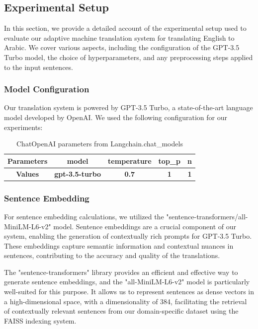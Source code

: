 \documentclass[12pt]{article}
\begin{document}
\subsection{Experimental Setup}

In this section, we provide a detailed account of the experimental setup used to evaluate our adaptive machine translation system for translating English to Arabic. We cover various aspects, including the configuration of the GPT-3.5 Turbo model, the choice of hyperparameters, and any preprocessing steps applied to the input sentences.

\subsubsection{Model Configuration}

Our translation system is powered by GPT-3.5 Turbo, a state-of-the-art language model developed by OpenAI. We used the following configuration for our experiments:


\begin{table}[h]
	\centering
	\begin{tabular}{|c|c|c|c|c|}
		\hline
		\textbf{Parameters} & \textbf{model} & \textbf{temperature} & \textbf{top\_p} & \textbf{n}\\
		\hline
		\textbf{Values} & \textbf{gpt-3.5-turbo} & \textbf{0.7}  & \textbf{1}  & \textbf{1}\\
		\hline
	\end{tabular}
	\caption{ChatOpenAI parameters from Langchain.chat\_models}
	\label{table:param_values}
\end{table}


\subsubsection{Sentence Embedding}

For sentence embedding calculations, we utilized the "sentence-transformers/all-MiniLM-L6-v2" model. Sentence embeddings are a crucial component of our system, enabling the generation of contextually rich prompts for GPT-3.5 Turbo. These embeddings capture semantic information and contextual nuances in sentences, contributing to the accuracy and quality of the translations.

The "sentence-transformers" library provides an efficient and effective way to generate sentence embeddings, and the "all-MiniLM-L6-v2" model is particularly well-suited for this purpose. It allows us to represent sentences as dense vectors in a high-dimensional space, with a dimensionality of 384, facilitating the retrieval of contextually relevant sentences from our domain-specific dataset using the FAISS indexing system.
\end{document}
